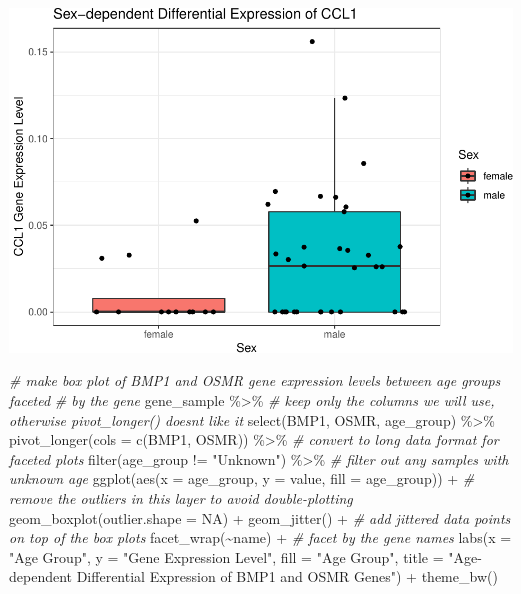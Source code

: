 \documentclass[
]{article}
\newenvironment{Shaded}{\begin{snugshade}}{\end{snugshade}}
\newcommand{\AttributeTok}[1]{\textcolor[rgb]{0.77,0.63,0.00}{#1}}
\newcommand{\CommentTok}[1]{\textcolor[rgb]{0.56,0.35,0.01}{\textit{#1}}}
\newcommand{\ConstantTok}[1]{\textcolor[rgb]{0.00,0.00,0.00}{#1}}
\newcommand{\FunctionTok}[1]{\textcolor[rgb]{0.00,0.00,0.00}{#1}}
\newcommand{\NormalTok}[1]{#1}
\newcommand{\SpecialCharTok}[1]{\textcolor[rgb]{0.00,0.00,0.00}{#1}}
\newcommand{\StringTok}[1]{\textcolor[rgb]{0.31,0.60,0.02}{#1}}
\begin{document}
\includegraphics{LiuKevin_Final_Project_files/figure-latex/unnamed-chunk-17-1.pdf}

\begin{Shaded}
\begin{Highlighting}[]
\CommentTok{\# make box plot of BMP1 and OSMR gene expression levels between age groups faceted }
\CommentTok{\# by the gene}
\NormalTok{gene\_sample }\SpecialCharTok{\%\textgreater{}\%} 
  \CommentTok{\# keep only the columns we will use, otherwise pivot\_longer() doesn\textquotesingle{}t like it}
  \FunctionTok{select}\NormalTok{(BMP1, OSMR, age\_group) }\SpecialCharTok{\%\textgreater{}\%} 
  \FunctionTok{pivot\_longer}\NormalTok{(}\AttributeTok{cols =} \FunctionTok{c}\NormalTok{(BMP1, OSMR)) }\SpecialCharTok{\%\textgreater{}\%} \CommentTok{\# convert to long data format for faceted plots}
  \FunctionTok{filter}\NormalTok{(age\_group }\SpecialCharTok{!=} \StringTok{"Unknown"}\NormalTok{) }\SpecialCharTok{\%\textgreater{}\%} \CommentTok{\# filter out any samples with unknown age}
  \FunctionTok{ggplot}\NormalTok{(}\FunctionTok{aes}\NormalTok{(}\AttributeTok{x =}\NormalTok{ age\_group, }\AttributeTok{y =}\NormalTok{ value, }\AttributeTok{fill =}\NormalTok{ age\_group)) }\SpecialCharTok{+}
  \CommentTok{\# remove the outliers in this layer to avoid double{-}plotting}
  \FunctionTok{geom\_boxplot}\NormalTok{(}\AttributeTok{outlier.shape =} \ConstantTok{NA}\NormalTok{) }\SpecialCharTok{+} 
  \FunctionTok{geom\_jitter}\NormalTok{() }\SpecialCharTok{+} \CommentTok{\# add jittered data points on top of the box plots}
  \FunctionTok{facet\_wrap}\NormalTok{(}\SpecialCharTok{\textasciitilde{}}\NormalTok{name) }\SpecialCharTok{+} \CommentTok{\# facet by the gene names}
  \FunctionTok{labs}\NormalTok{(}\AttributeTok{x =} \StringTok{"Age Group"}\NormalTok{, }\AttributeTok{y =} \StringTok{"Gene Expression Level"}\NormalTok{, }\AttributeTok{fill =} \StringTok{"Age Group"}\NormalTok{, }
       \AttributeTok{title =} \StringTok{"Age{-}dependent Differential Expression of BMP1 and OSMR Genes"}\NormalTok{) }\SpecialCharTok{+}
  \FunctionTok{theme\_bw}\NormalTok{()}
\end{Highlighting}
\end{Shaded}
\end{document}
